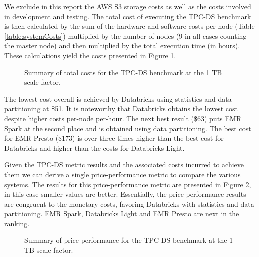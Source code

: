 We exclude in this report the AWS S3 storage costs as well as the costs involved in development and testing. The total cost of executing the TPC-DS benchmark is then calculated by the sum of the hardware and software costs per-node (Table \ref{table:systemCosts}) multiplied by the number of nodes (9 in all cases counting the master node) and then multiplied by the total execution time (in hours). These calculations yield the costs presented in Figure \ref{fig:totalCostsSummary}.

\begin{figure}
   \begin{center}
   \end{center}
   \caption{Summary of total costs for the TPC-DS benchmark at the 1 TB scale factor.}
   \label{fig:totalCostsSummary}
\end{figure}

The lowest cost overall is achieved by Databricks using statistics and data partitioning at \$51. It is noteworthy that Databricks obtains the lowest cost despite higher costs per-node per-hour. The next best result (\$63) puts EMR Spark at the second place and is obtained using data partitioning. The best cost for EMR Presto (\$173) is over three times higher than the best cost for Databricks and higher than the costs for Databricks Light.

Given the TPC-DS metric results and the associated costs incurred to achieve them we can derive a single price-performance metric to compare the various systems. The results for this price-performance metric are presented in Figure \ref{fig:pricePerformanceSummary}, in this case smaller values are better. Essentially, the price-performance results are congruent to the monetary costs, favoring Databricks with statistics and data partitioning. EMR Spark, Databricks Light and EMR Presto are next in the ranking.

\begin{figure}
   \begin{center}
   \end{center}
   \caption{Summary of price-performance for the TPC-DS benchmark at the 1 TB scale factor.}
   \label{fig:pricePerformanceSummary}
\end{figure}










